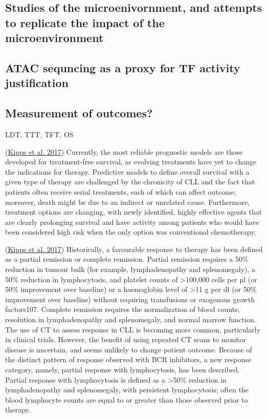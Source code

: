 \documentclass[11pt, a4paper, twosided]{book}
\begin{document}
\hypertarget{studies-of-the-microenivornment-and-attempts-to-replicate-the-impact-of-the-microenvironment}{%
\subsection{Studies of the microenivornment, and attempts to replicate the impact of the microenvironment}\label{studies-of-the-microenivornment-and-attempts-to-replicate-the-impact-of-the-microenvironment}}

\hypertarget{intro-ATACseq}{%
\subsection{ATAC sequncing as a proxy for TF activity justification}\label{intro-ATACseq}}

\hypertarget{measurement-of-outcomes}{%
\subsection{Measurement of outcomes?}\label{measurement-of-outcomes}}

LDT, TTT, TFT, OS

(\protect\hyperlink{ref-Kipps2017}{Kipps et al. 2017})
Currently, the most reliable prognostic models are those developed for treatment-free survival, as evolving treatments have yet to change the indications for therapy. Predictive models to define overall survival with a given type of therapy are challenged by the chronicity of CLL and the fact that patients often receive serial treatments, each of which can affect outcome; moreover, death might be due to an indirect or unrelated cause. Furthermore, treatment options are changing, with newly identified, highly effective agents that are clearly prolonging survival and have activity among patients who would have been considered high risk when the only option was conventional chemotherapy.

(\protect\hyperlink{ref-Kipps2017}{Kipps et al. 2017})
Historically, a favourable response to therapy has been defined as a partial remission or complete remission. Partial remission requires a 50\% reduction in tumour bulk (for example, lymphadenopathy and splenomegaly), a 50\% reduction in lymphocytosis, and platelet counts of \textgreater100,000 cells per µl (or 50\% improvement over baseline) or a haemoglobin level of \textgreater11 g per dl (or 50\% improvement over baseline) without requiring transfusions or exogenous growth factors107. Complete remission requires the normalization of blood counts, resolution in lymphadenopathy and splenomegaly, and normal marrow function. The use of CT to assess response in CLL is becoming more common, particularly in clinical trials. However, the benefit of using repeated CT scans to monitor disease is uncertain, and seems unlikely to change patient outcome. Because of the distinct pattern of response observed with BCR inhibitors, a new response category, namely, partial response with lymphocytosis, has been described. Partial response with lymphocytosis is defined as a \textgreater50\% reduction in lymphadenopathy and splenomegaly, with persistent lymphocytosis; often the blood lymphocyte counts are equal to or greater than those observed prior to therapy.
\end{document}

